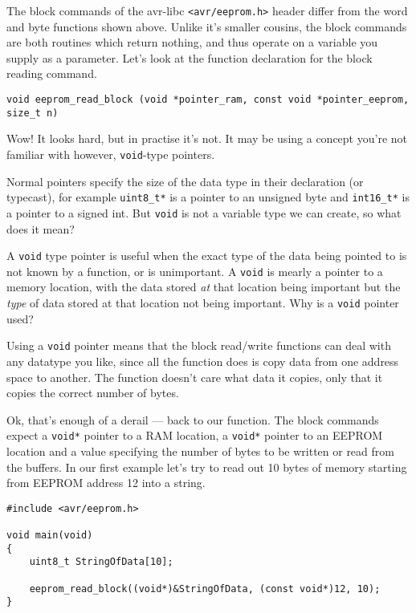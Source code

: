 \documentclass[a4paper,oneside,notitlepage]{book}
\begin{document}
The block commands of the avr-libc \lstinline{<avr/eeprom.h>} header differ from the word and byte functions shown above. Unlike it's smaller cousins, the block commands are both routines which return nothing, and thus operate on a variable you supply as a parameter. Let's look at the function declaration for the block reading command.

\begin{center}
\begin{lstlisting}
void eeprom_read_block (void *pointer_ram, const void *pointer_eeprom, size_t n)
\end{lstlisting}
\end{center}

Wow! It looks hard, but in practise it's not. It may be using a concept you're not familiar with however, \lstinline{void}-type pointers.

Normal pointers specify the size of the data type in their declaration (or typecast), for example \lstinline{uint8_t*} is a pointer to an unsigned byte and \lstinline{int16_t*} is a pointer to a signed int. But \lstinline{void} is not a variable type we can create, so what does it mean?

A \lstinline{void} type pointer is useful when the exact type of the data being pointed to is not known by a function, or is unimportant. A \lstinline{void} is mearly a pointer to a memory location, with the data stored \textit{at} that location being important but the \textit{type} of data stored at that location not being important. Why is a \lstinline{void} pointer used?

Using a \lstinline{void} pointer means that the block read/write functions can deal with any datatype you like, since all the function does is copy data from one address space to another. The function doesn't care what data it copies, only that it copies the correct number of bytes.

Ok, that's enough of a derail --- back to our function. The block commands expect a \lstinline{void*} pointer to a RAM location, a \lstinline{void*} pointer to an EEPROM location and a value specifying the number of bytes to be written or read from the buffers. In our first example let's try to read out 10 bytes of memory starting from EEPROM address 12 into a string.

\begin{center}
\begin{lstlisting}
#include <avr/eeprom.h>

void main(void)
{
    uint8_t StringOfData[10];

    eeprom_read_block((void*)&StringOfData, (const void*)12, 10);
}
\end{lstlisting}
\end{center}
\end{document}
